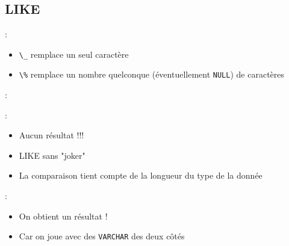 \documentclass[10pt]{beamer}
\begin{document}
\subsection{LIKE}
\begin{frame}{\secname : \subsecname}
    
    \begin{itemize}
        \item \lstinline[language=plsql]!\_! remplace un seul caractère
        \item \lstinline[language=plsql]!\%! remplace un nombre quelconque (éventuellement \lstinline[language=plsql]!NULL!) de caractères
    \end{itemize}
\end{frame}

\begin{frame}{\secname : \subsecname}
    
\end{frame}

\begin{frame}{\secname : \subsecname}
    
    \begin{itemize}
        \item Aucun résultat !!!
        \item LIKE sans "joker"
        \item La comparaison tient compte de la longueur du type de la donnée
    \end{itemize}
\end{frame}

\begin{frame}{\secname : \subsecname}
    
    \begin{itemize}
        \item On obtient un résultat !
        \item Car on joue avec des \lstinline[language=plsql]!VARCHAR! des deux côtés
    \end{itemize}
\end{frame}
\end{document}
